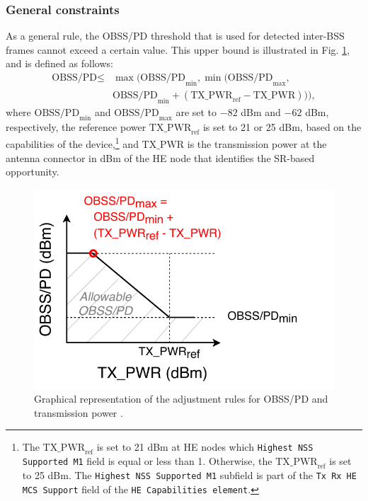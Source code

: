 \documentclass{ieeeaccess}
\begin{document}
\subsubsection{General constraints}
As a general rule, the OBSS/PD threshold that is used for detected inter-BSS frames cannot exceed a certain value. This upper bound is illustrated in Fig. \ref{fig:fig_7}, and is defined as follows:
\begin{align}\nonumber \text{OBSS/PD} \leq & \max\Big(\text{OBSS/PD}_{\min}, \min\big(\text{OBSS/PD}_{\max},\\ & \text{OBSS/PD}_{\min} + (\text{TX\_PWR}_{\text{ref}}-\text{TX\_PWR})\big)\Big), \nonumber \end{align}
where $\text{OBSS/PD}_{\min}$ and $\text{OBSS/PD}_{\max}$ are set to $-82$ dBm and $-62$ dBm, respectively, the reference power $\text{TX\_PWR}_{\text{ref}}$ is set to 21 or 25 dBm, based on the
capabilities of the device,\footnote{The $\text{TX\_PWR}_{\text{ref}}$ is set to 21 dBm at HE nodes which \texttt{Highest NSS Supported M1} field is equal or less than 1. Otherwise, the  $\text{TX\_PWR}_{\text{ref}}$ is set to 25 dBm. The \texttt{Highest NSS Supported M1} subfield is part of the \texttt{Tx Rx HE MCS Support} field of the \texttt{HE Capabilities element}.} and $\text{TX\_PWR}$ is the transmission power at the antenna connector in dBm of the HE node that identifies the SR-based opportunity.
\begin{figure}[ht!]
	\centering
	\includegraphics[width=0.8\columnwidth]{fig_10}
	\caption{Graphical representation of the adjustment rules for OBSS/PD and transmission power \cite{tgax2019draft}.}
	\label{fig:fig_7}
\end{figure}
\end{document}
